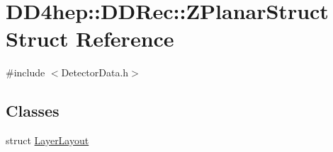 \hypertarget{struct_d_d4hep_1_1_d_d_rec_1_1_z_planar_struct}{}\section{D\+D4hep\+:\+:D\+D\+Rec\+:\+:Z\+Planar\+Struct Struct Reference}
\label{struct_d_d4hep_1_1_d_d_rec_1_1_z_planar_struct}


{\ttfamily \#include $<$Detector\+Data.\+h$>$}

\subsection*{Classes}
\begin{DoxyCompactItemize}
\item 
struct \hyperlink{struct_d_d4hep_1_1_d_d_rec_1_1_z_planar_struct_1_1_layer_layout}{Layer\+Layout}
\end{DoxyCompactItemize}

